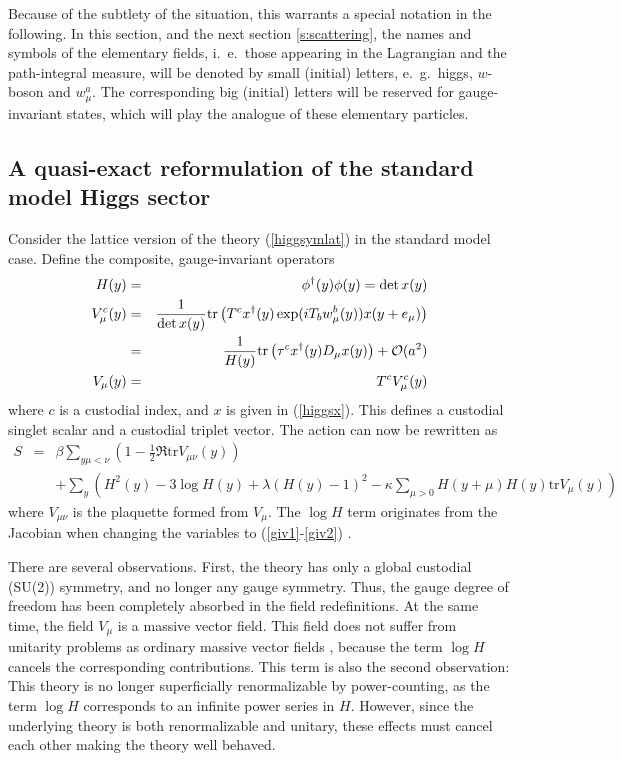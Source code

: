 \documentclass[final,12pt]{article}
\newcommand*{\no}{\noindent}
\newcommand*{\bea}{\begin{eqnarray}}
\newcommand*{\eea}{\end{eqnarray}}
\newcommand*{\pref}[1]{(\ref{#1})}
\newcommand*{\mn}{{\mu\nu}}
\newcommand*{\prefr}[2]{(\ref{#1}-\ref{#2})}
\newcommand*{\nn}{\nonumber}
\newcommand*{\tr}{\mathrm{tr}}
\newcommand*{\1}{1\!\!\!\bot}
\begin{document}
Because of the subtlety of the situation, this warrants a special notation in the following. In this section, and the next section \ref{s:scattering}, the names and symbols of the elementary fields, i.\ e.\ those appearing in the Lagrangian and the path-integral measure, will be denoted by small (initial) letters, e.\ g.\ higgs, $w$-boson and $w_\mu^a$. The corresponding big (initial) letters will be reserved for gauge-invariant states, which will play the analogue of these elementary particles.

\subsection{A quasi-exact reformulation of the standard model Higgs sector}\label{ss:reformsm}

Consider the lattice version of the theory \pref{higgsymlat} in the standard model case. Define the composite, gauge-invariant operators
\bea
H(y)&=&\phi^\dagger(y)\phi(y)=\det x(y)\label{giv1}\\
V_\mu^c(y)&=&\frac{1}{\det x(y)}\tr\left(T^c x^\dagger(y) \exp(iT_bw^b_\mu(y))x(y+e_\mu)\right)\nn\\
&=&\frac{1}{H(y)}\tr\left(\tau^c x^\dagger(y) D_\mu x(y)\right)+{\cal O}(a^2)\label{giv2}\\
V_\mu(y)&=&T^cV_\mu^c(y)\nn
\eea
\no where $c$ is a custodial index, and $x$ is given in \pref{higgsx}. This defines a custodial singlet scalar and a custodial triplet vector. The action can now be rewritten as \cite{Frohlich:1980gj,Frohlich:1981yi,Langguth:1985eu,Philipsen:1996af,Masson:2010vx,Attard:2017sdn,Kondo:2018qus}
\bea
S&=&\beta\sum_{y\mu<\nu}\left(1-\frac{1}{2}\Re\tr V_{\mn}(y)\right)\nn\\
&&+\sum_y\left(H^2(y)-3\log H(y)+\lambda(H(y)-1)^2-\kappa\sum_{\mu>0}H(y+\mu)H(y)\tr V_\mu(y)\right)\label{giv3}
\eea
\no where $V_\mn$ is the plaquette formed from $V_\mu$. The $\log H$ term originates from the Jacobian when changing the variables to \prefr{giv1}{giv2} \cite{Langguth:1985eu}.

There are several observations. First, the theory has only a global custodial (SU(2)) symmetry, and no longer any gauge symmetry. Thus, the gauge degree of freedom has been completely absorbed in the field redefinitions. At the same time, the field $V_\mu$ is a massive vector field. This field does not suffer from unitarity problems as ordinary massive vector fields \cite{Bohm:2001yx}, because the term $\log H$ cancels the corresponding contributions. This term is also the second observation: This theory is no longer superficially renormalizable by power-counting, as the term $\log H$ corresponds to an infinite power series in $H$. However, since the underlying theory is both renormalizable and unitary, these effects must cancel each other making the theory well behaved.
\end{document}
